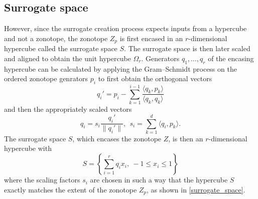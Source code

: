 \documentclass[
  a4paper,  %
  twoside,  %
  bibliography=totoc,
  headsepline,
  cleardoublepage=empty,
  parskip=half,
  draft=false
]{scrbook}
\begin{document}
\subsection{Surrogate space}

However, since the surrogate creation process expects inputs from a hypercube and not a zonotope, the zonotope $Z_p$ is first encased in an $r$-dimensional hypercube called the surrogate space $S$.
The surrogate space is then later scaled and aligned to obtain the unit hypercube $\Omega_r$.
Generators $q_1, \dots, q_r$ of the encasing hypercube can be calculated by applying the Gram–Schmidt process on the ordered zonotope genrators $p_i$ to first obtain the orthogonal vectors
\begin{equation}
q_i'=p_i - \sum_{k=1}^{i-1} \frac{\langle q_k, p_k\rangle}{\langle q_k, q_k\rangle}
\label{q}
\end{equation}
and then the appropriately scaled vectors
\begin{equation}
q_i=s_i \frac{q_i'}{\| q_i' \|},~~ s_i=\sum_{k=1}^d \langle q_i, p_k\rangle.
\label{q_scaled}
\end{equation}
The surrogate space $S$, which encases the zonotope $Z$, is then an $r$-dimensional hypercube with
\begin{equation}
S=\left\{\sum_{i=1}^r q_i x_i, ~ -1 \leq x_i \leq 1\right\}
\label{surrogate_space}
\end{equation}
where the scaling factors $s_i$ are chosen in such a way that the hypercube $S$ exactly matches the extent of the zonotope $Z_p$, as shown in \cref{surrogate_space}.
\end{document}
